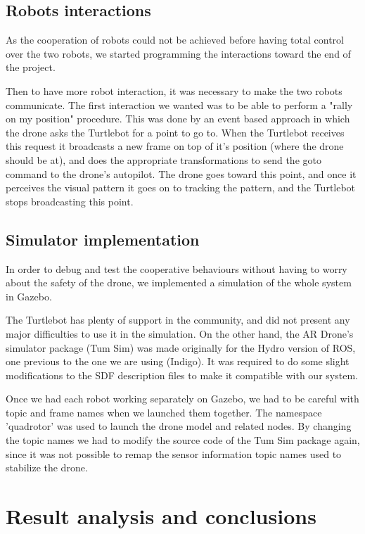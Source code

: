 \documentclass[11pt,a4paper]{article}
\begin{document}
\subsection{Robots interactions}


As the cooperation of robots could not be achieved before having total control over the two robots, 
we started programming the interactions toward the end of the project.

Then to have more robot interaction, it was necessary to make the two robots communicate.
The first interaction we wanted was to be able to perform a "rally on my position" procedure.
This was done by an event based approach in which the drone asks the Turtlebot for a point to go to. When the Turtlebot receives this request it broadcasts a new frame on top of it's position (where the drone should be at), and does the appropriate transformations to send the goto command to the drone's autopilot. The drone goes toward this point, and once it perceives the visual pattern it goes on to tracking the pattern, and the Turtlebot stops broadcasting this point.

\subsection{Simulator implementation}
In order to debug and test the cooperative behaviours without having to worry about the safety of the drone, we implemented a simulation of the whole system in Gazebo.

The Turtlebot has plenty of support in the community, and did not present any major difficulties to use it in the simulation. On the other hand, the AR Drone's simulator package (Tum Sim) was made originally for the Hydro version of ROS, one previous to the one we are using (Indigo). It was required to do some slight modifications to the SDF description files to make it compatible with our system.

Once we had each robot working separately on Gazebo, we had to be careful with topic and frame names when we launched them together. The namespace 'quadrotor' was used to launch the drone model and related nodes. By changing the topic names we had to modify the source code of the Tum Sim package again, since it was not possible to remap the sensor information topic names used to stabilize the drone.


\section{Result analysis and conclusions}
\end{document}
